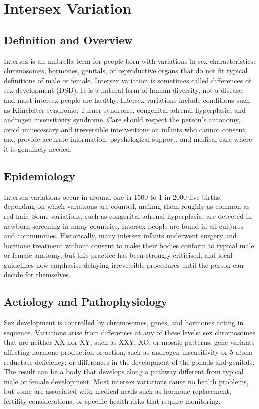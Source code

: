\chapter{Intersex Variation}

\section*{Definition and Overview}
Intersex is an umbrella term for people born with variations in sex characteristics: chromosomes, hormones, genitals, or reproductive organs that do not fit typical definitions of male or female. Intersex variation is sometimes called differences of sex development (DSD). It is a natural form of human diversity, not a disease, and most intersex people are healthy. Intersex variations include conditions such as Klinefelter syndrome, Turner syndrome, congenital adrenal hyperplasia, and androgen insensitivity syndrome. Care should respect the person's autonomy, avoid unnecessary and irreversible interventions on infants who cannot consent, and provide accurate information, psychological support, and medical care where it is genuinely needed.

\section*{Epidemiology}
Intersex variations occur in around one in 1500 to 1 in 2000 live births, depending on which variations are counted, making them roughly as common as red hair. Some variations, such as congenital adrenal hyperplasia, are detected in newborn screening in many countries. Intersex people are found in all cultures and communities. Historically, many intersex infants underwent surgery and hormone treatment without consent to make their bodies conform to typical male or female anatomy, but this practice has been strongly criticised, and local guidelines now emphasise delaying irreversible procedures until the person can decide for themselves.

\section*{Aetiology and Pathophysiology}
Sex development is controlled by chromosomes, genes, and hormones acting in sequence. Variations arise from differences at any of these levels: sex chromosomes that are neither XX nor XY, such as XXY, XO, or mosaic patterns; gene variants affecting hormone production or action, such as androgen insensitivity or 5-alpha reductase deficiency; or differences in the development of the gonads and genitals. The result can be a body that develops along a pathway different from typical male or female development. Most intersex variations cause no health problems, but some are associated with medical needs such as hormone replacement, fertility considerations, or specific health risks that require monitoring.

